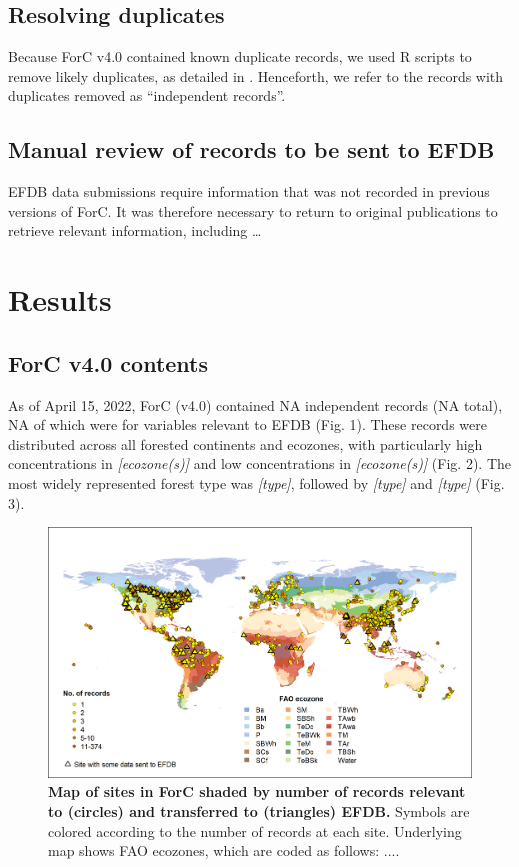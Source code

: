 \documentclass[, manuscript]{copernicus}
\begin{document}
\subsection{Resolving duplicates}

Because ForC v4.0 contained known duplicate records, we used R scripts
to remove likely duplicates, as detailed in
\citet{anderson-teixeira_carbon_2021}. Henceforth, we refer to the
records with duplicates removed as ``independent records''.

\subsection{Manual review of records to be sent to EFDB}

EFDB data submissions require information that was not recorded in
previous versions of ForC. It was therefore necessary to return to
original publications to retrieve relevant information, including
\ldots{}

\section{Results}

\subsection{ForC v4.0 contents}

As of April 15, 2022, ForC (v4.0) contained NA independent records (NA
total), NA of which were for variables relevant to EFDB (Fig. 1). These
records were distributed across all forested continents and ecozones,
with particularly high concentrations in \emph{{[}ecozone(s){]}} and low
concentrations in \emph{{[}ecozone(s){]}} (Fig. 2). The most widely
represented forest type was \emph{{[}type{]}}, followed by
\emph{{[}type{]}} and \emph{{[}type{]}} (Fig. 3).

\begin{figure}
\includegraphics[width=15cm]{figures_tables/World_Map_of_sites_with_FAO_and_IPCC_data_sent} \caption{\textbf{Map of sites in ForC shaded by number of records relevant to (circles) and transferred to (triangles) EFDB.} Symbols are colored according to the number of records at each site. Underlying map shows FAO ecozones, which are coded as follows: ....}\label{fig:fig_map}
\end{figure}
\end{document}
